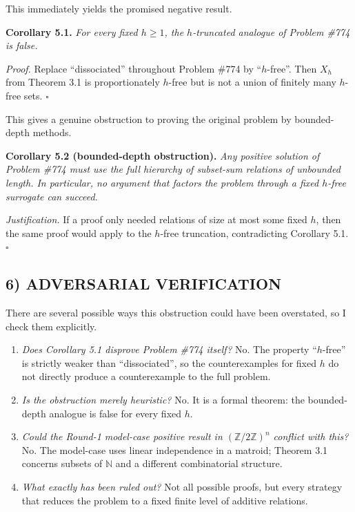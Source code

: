 This immediately yields the promised negative result.

\medskip
\noindent\textbf{Corollary 5.1.} \emph{For every fixed $h\ge 1$, the $h$-truncated analogue of Problem \#774 is false.}

\medskip
\noindent\emph{Proof.} Replace ``dissociated'' throughout Problem \#774 by ``$h$-free''. Then $X_h$ from Theorem 3.1 is proportionately $h$-free but is not a union of finitely many $h$-free sets. \hfill$\square$

\medskip
This gives a genuine obstruction to proving the original problem by bounded-depth methods.

\medskip
\noindent\textbf{Corollary 5.2 (bounded-depth obstruction).} \emph{Any positive solution of Problem \#774 must use the full hierarchy of subset-sum relations of unbounded length. In particular, no argument that factors the problem through a fixed $h$-free surrogate can succeed.}

\medskip
\noindent\emph{Justification.} If a proof only needed relations of size at most some fixed $h$, then the same proof would apply to the $h$-free truncation, contradicting Corollary 5.1. \hfill$\square$

\subsection*{6) ADVERSARIAL VERIFICATION}
There are several possible ways this obstruction could have been overstated, so I check them explicitly.

\begin{enumerate}
\item \emph{Does Corollary 5.1 disprove Problem \#774 itself?} No. The property ``$h$-free'' is strictly weaker than ``dissociated'', so the counterexamples for fixed $h$ do not directly produce a counterexample to the full problem.

\item \emph{Is the obstruction merely heuristic?} No. It is a formal theorem: the bounded-depth analogue is false for every fixed $h$.

\item \emph{Could the Round-1 model-case positive result in $(\mathbb Z/2\mathbb Z)^n$ conflict with this?} No. The model-case uses linear independence in a matroid; Theorem 3.1 concerns subsets of $\mathbb N$ and a different combinatorial structure.

\item \emph{What exactly has been ruled out?} Not all possible proofs, but every strategy that reduces the problem to a fixed finite level of additive relations.
\end{enumerate}


